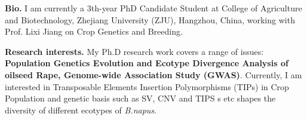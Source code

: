 %
%

\par{
{\textbf{Bio.}} 
I am currently a 3th-year PhD Candidate Student at College of Agriculture and Biotechnology, Zhejiang University (ZJU), Hangzhou, China, 
 working with Prof. Lixi Jiang on Crop Genetics and Breeding. 

{\textbf{Research interests.}} 
My Ph.D research work covers a range of issues: \textbf{Population Genetics Evolution and Ecotype Divergence Analysis of oilseed Rape, 
Genome-wide Association Study (GWAS)}. Currently, I am interested in Transposable Elements Insertion Polymorphisms (TIPs) in Crop Population and genetic basis such as SV, CNV and TIPS
s etc shapes the diversity of different ecotypes of \emph{B.napus}.  
}